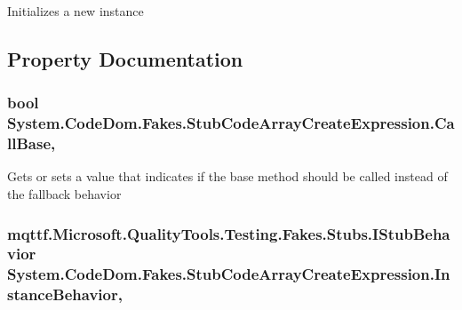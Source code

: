 Initializes a new instance



\subsection{Property Documentation}
\hypertarget{class_system_1_1_code_dom_1_1_fakes_1_1_stub_code_array_create_expression_a8754b5861a52851131ae3ed77fd0d6ea}{
\subsubsection[{Call\-Base}]{\setlength{\rightskip}{0pt plus 5cm}bool System.\-Code\-Dom.\-Fakes.\-Stub\-Code\-Array\-Create\-Expression.\-Call\-Base\hspace{0.3cm}{\ttfamily [get]}, {\ttfamily [set]}}}\label{class_system_1_1_code_dom_1_1_fakes_1_1_stub_code_array_create_expression_a8754b5861a52851131ae3ed77fd0d6ea}


Gets or sets a value that indicates if the base method should be called instead of the fallback behavior

\hypertarget{class_system_1_1_code_dom_1_1_fakes_1_1_stub_code_array_create_expression_a58cb212a8d49a7e915c821387daf543e}{
\subsubsection[{Instance\-Behavior}]{\setlength{\rightskip}{0pt plus 5cm}mqttf.\-Microsoft.\-Quality\-Tools.\-Testing.\-Fakes.\-Stubs.\-I\-Stub\-Behavior System.\-Code\-Dom.\-Fakes.\-Stub\-Code\-Array\-Create\-Expression.\-Instance\-Behavior\hspace{0.3cm}{\ttfamily [get]}, {\ttfamily [set]}}}\label{class_system_1_1_code_dom_1_1_fakes_1_1_stub_code_array_create_expression_a58cb212a8d49a7e915c821387daf543e}


